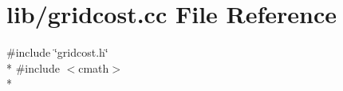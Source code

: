 \section{lib/gridcost.cc File Reference}
\label{gridcost_8cc}
{\ttfamily \#include \char`\"{}gridcost.\-h\char`\"{}}\\*
{\ttfamily \#include $<$cmath$>$}\\*
